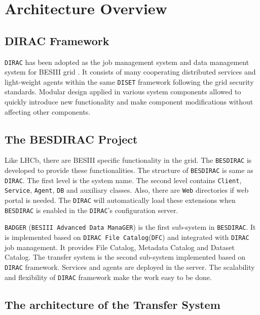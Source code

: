 \section{Architecture Overview}

\subsection{DIRAC Framework}

{\tt DIRAC} \cite{bib:dirac3,bib:diracgit} 
has been adopted as the job management system and data management
system for BESIII grid \cite{bib:besdfc}. 
%
It consists of many cooperating distributed services and light-weight
agents within the same {\tt DISET} framework following the grid
security standards.
Modular design applied in various system components allowed to quickly
introduce new functionality and make component modifications without
affecting other components.

\subsection{The BESDIRAC Project}

Like LHCb, there are BESIII specific functionality in the grid.
The {\tt BESDIRAC} \cite{bib:besdirac} 
is developed to provide these functionalities.
The structure of {\tt BESDIRAC} is same as {\tt DIRAC}.
The first level is the system name. The second level contains
{\tt Client}, {\tt Service}, {\tt Agent}, {\tt DB} and auxiliary classes.
Also, there are {\tt Web} directories if web portal is needed.
The {\tt DIRAC} will automatically load these extensions when 
{\tt BESDIRAC} is enabled in the {\tt DIRAC}'s configuration server.

{\tt BADGER} (\verb"BESIII Advanced Data ManaGER") is the first sub-system
in {\tt BESDIRAC}. It is implemented based on {\tt DIRAC File
Catalog}(\verb"DFC")
and integrated with {\tt DIRAC} job management.
It provides File Catalog, Metadata Catalog and Dataset Catalog.
%
The transfer system is the second sub-system implemented based on
{\tt DIRAC} framework. Services and agents are deployed in the server.
The scalability and flexibility of {\tt DIRAC} framework make the work
easy to be done. 

\subsection{The architecture of the Transfer System}

